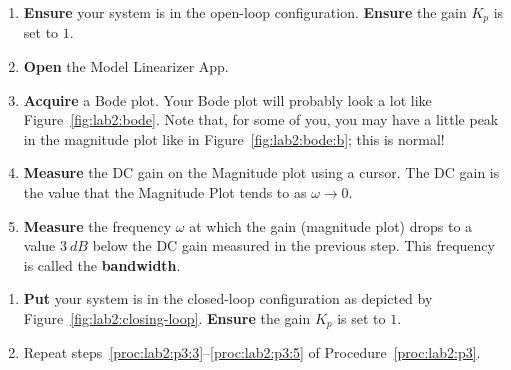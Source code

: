 %
\begin{procedure}[label={proc:lab2:p3}]
  \begin{enumerate}[label=(\arabic*)]
    \item{
      \textbf{Ensure} your system is in the open-loop configuration.
      \textbf{Ensure} the gain \(K_p\) is set to \(1.\)
    }
    \item{
      \textbf{Open} the Model Linearizer App.
    }
    \item{
      \textbf{Acquire} a Bode plot. Your Bode plot will probably look a lot
      like Figure~\ref{fig:lab2:bode}. Note that, for some of you, you may
      have a little peak in the magnitude plot like in
      Figure~\ref{fig:lab2:bode:b}; this is normal!
      \label{proc:lab2:p3:3}
    }
    \item{
      \textbf{Measure} the DC gain on the Magnitude plot using a cursor.
      The DC gain is the value that the Magnitude Plot tends to
      as \(\omega \to 0.\)
    }
    \item{
      \textbf{Measure} the frequency \(\omega\) at which the gain
      (magnitude plot) drops to a value \(\SI{3}{dB}\)
      below the DC gain measured in the previous step. This frequency
      is called the \textbf{bandwidth}.
      \label{proc:lab2:p3:5}
    }
  \end{enumerate}
\end{procedure}
%
\begin{procedure}[label={proc:lab2:p4}]
  \begin{enumerate}[label=(\arabic*)]
    \item{
      \textbf{Put} your system is in the closed-loop configuration as
      depicted by Figure~\ref{fig:lab2:closing-loop}.
      \textbf{Ensure} the gain \(K_p\) is set to \(1.\)
    }
    \item{
      Repeat steps~\ref{proc:lab2:p3:3}--\ref{proc:lab2:p3:5} of
      Procedure~\ref{proc:lab2:p3}.
    }
  \end{enumerate}
\end{procedure}
